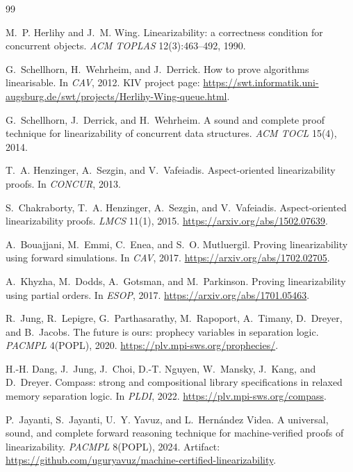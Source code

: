\documentclass[11pt]{article}
\begin{document}
\begin{thebibliography}{99}

M.~P. Herlihy and J.~M. Wing.
\newblock Linearizability: a correctness condition for concurrent objects.
\newblock \emph{ACM TOPLAS} 12(3):463--492, 1990.

G.~Schellhorn, H.~Wehrheim, and J.~Derrick.
\newblock How to prove algorithms linearisable.
\newblock In \emph{CAV}, 2012.
\newblock KIV project page:
\url{https://swt.informatik.uni-augsburg.de/swt/projects/Herlihy-Wing-queue.html}.

G.~Schellhorn, J.~Derrick, and H.~Wehrheim.
\newblock A sound and complete proof technique for linearizability of
  concurrent data structures.
\newblock \emph{ACM TOCL} 15(4), 2014.

T.~A. Henzinger, A.~Sezgin, and V.~Vafeiadis.
\newblock Aspect-oriented linearizability proofs.
\newblock In \emph{CONCUR}, 2013.

S.~Chakraborty, T.~A. Henzinger, A.~Sezgin, and V.~Vafeiadis.
\newblock Aspect-oriented linearizability proofs.
\newblock \emph{LMCS} 11(1), 2015.
\newblock \url{https://arxiv.org/abs/1502.07639}.

A.~Bouajjani, M.~Emmi, C.~Enea, and S.~O. Mutluergil.
\newblock Proving linearizability using forward simulations.
\newblock In \emph{CAV}, 2017.
\newblock \url{https://arxiv.org/abs/1702.02705}.

A.~Khyzha, M.~Dodds, A.~Gotsman, and M.~Parkinson.
\newblock Proving linearizability using partial orders.
\newblock In \emph{ESOP}, 2017.
\newblock \url{https://arxiv.org/abs/1701.05463}.

R.~Jung, R.~Lepigre, G.~Parthasarathy, M.~Rapoport, A.~Timany, D.~Dreyer,
  and B.~Jacobs.
\newblock The future is ours: prophecy variables in separation logic.
\newblock \emph{PACMPL} 4(POPL), 2020.
\newblock \url{https://plv.mpi-sws.org/prophecies/}.

H.-H. Dang, J.~Jung, J.~Choi, D.-T. Nguyen, W.~Mansky, J.~Kang, and
  D.~Dreyer.
\newblock Compass: strong and compositional library specifications in
  relaxed memory separation logic.
\newblock In \emph{PLDI}, 2022.
\newblock \url{https://plv.mpi-sws.org/compass}.

P.~Jayanti, S.~Jayanti, U.~Y. Yavuz, and L.~Hern\'andez Videa.
\newblock A universal, sound, and complete forward reasoning technique for
  machine-verified proofs of linearizability.
\newblock \emph{PACMPL} 8(POPL), 2024.
\newblock Artifact:
\url{https://github.com/uguryavuz/machine-certified-linearizability}.


\end{thebibliography}
\end{document}
